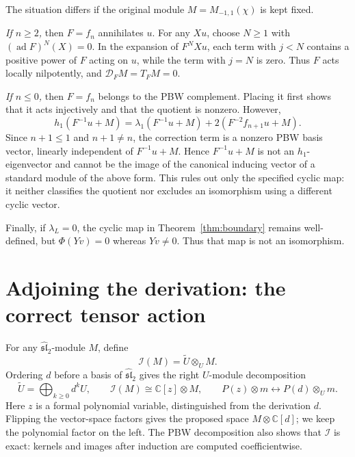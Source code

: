 \documentclass[11pt]{article}
\newcommand{\C}{\mathbb C}
\newcommand{\g}{\widehat{\mathfrak{sl}}_2}
\newcommand{\ad}{\operatorname{ad}}
\newcommand{\I}{\mathcal I}
\newcommand{\D}{\mathcal D}
\theoremstyle{definition}
\begin{document}
The situation differs if the original module
\(M=M_{-1,1}(\chi)\) is kept fixed.

\emph{If \(n\ge2\),} then \(F=f_n\) annihilates \(u\). For any
\(Xu\), choose \(N\ge1\) with \((\ad F)^N(X)=0\). In the expansion
of \(F^NXu\), each term with \(j<N\) contains a positive power of
\(F\) acting on \(u\), while the term with \(j=N\) is zero.
Thus \(F\) acts locally nilpotently, and \(\D_FM=T_FM=0\).

\emph{If \(n\le0\),} then \(F=f_n\) belongs to the PBW complement.
Placing it first shows that it acts injectively and that the quotient
is nonzero. However,
\[
 h_1(F^{-1}u+M)
 =\lambda_1(F^{-1}u+M)+2(F^{-2}f_{n+1}u+M).
\]
Since \(n+1\le1\) and \(n+1\ne n\), the correction term is a nonzero
PBW basis vector, linearly independent of \(F^{-1}u+M\). Hence
\(F^{-1}u+M\) is not an \(h_1\)-eigenvector and cannot be the image
of the canonical inducing vector of a standard module of the above
form. This rules out only the specified cyclic map: it neither
classifies the quotient nor excludes an isomorphism using a different
cyclic vector.

Finally, if \(\lambda_L=0\), the cyclic map in
Theorem~\ref{thm:boundary} remains well-defined, but
\(\Phi(Yv)=0\) whereas \(Yv\ne0\). Thus that map is not an isomorphism.

\section{Adjoining the derivation: the correct tensor action}

For any \(\g\)-module \(M\), define
\[
 \I(M)=\widetilde U\otimes_U M.
\]
Ordering \(d\) before a basis of \(\g\) gives the right \(U\)-module
decomposition
\[
 \widetilde U=\bigoplus_{k\ge0}d^kU,\qquad
 \I(M)\cong\C[z]\otimes M,\qquad
 P(z)\otimes m\longleftrightarrow P(d)\otimes_U m.
\]
Here \(z\) is a formal polynomial variable, distinguished from the
derivation \(d\). Flipping the vector-space factors gives the proposed
space \(M\otimes\C[d]\); we keep the polynomial factor on the left.
The PBW decomposition also shows that \(\I\) is exact: kernels and
images after induction are computed coefficientwise.
\end{document}
